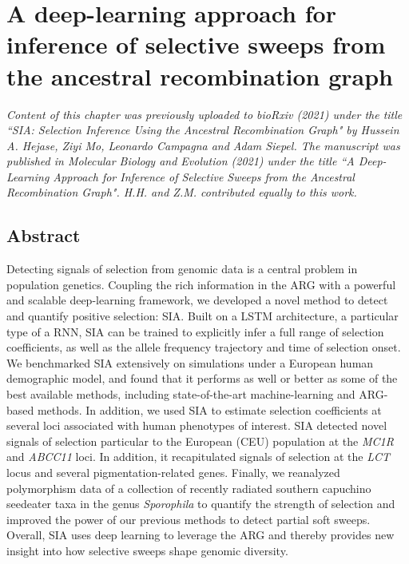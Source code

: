 \chapter{A deep-learning approach for inference of selective sweeps from the ancestral recombination graph}

\textit{Content of this chapter was previously uploaded to bioRxiv (2021) under the title ``SIA: Selection Inference Using the Ancestral Recombination Graph" by Hussein A. Hejase, Ziyi Mo, Leonardo Campagna and Adam Siepel. The manuscript was published in Molecular Biology and Evolution (2021) under the title ``A Deep-Learning Approach for Inference of Selective Sweeps from the Ancestral Recombination Graph". H.H. and Z.M. contributed equally to this work.}

\section{Abstract}

Detecting signals of selection from genomic data is a central problem in population genetics. Coupling the rich information in the \acf{ARG} with a powerful and scalable deep-learning framework, we developed a novel method to detect and quantify positive selection: \acf{SIA}. Built on a \ac{LSTM} architecture, a particular type of a \ac{RNN}, SIA can be trained to explicitly infer a full range of selection coefficients, as well as the allele frequency trajectory and time of selection onset. We benchmarked \ac{SIA} extensively on simulations under a European human demographic model, and found that it performs as well or better as some of the best available methods, including state-of-the-art machine-learning and \ac{ARG}-based methods. In addition, we used \ac{SIA} to estimate selection coefficients at several loci associated with human phenotypes of interest. \ac{SIA} detected novel signals of selection particular to the European (CEU) population at the \textit{MC1R} and \textit{ABCC11} loci. In addition, it recapitulated signals of selection at the \textit{LCT} locus and several pigmentation-related genes. Finally, we reanalyzed polymorphism data of a collection of recently radiated southern capuchino seedeater taxa in the genus \textit{Sporophila} to quantify the strength of selection and improved the power of our previous methods to detect partial soft sweeps. Overall, \ac{SIA} uses deep learning to leverage the \ac{ARG} and thereby provides new insight into how selective sweeps shape genomic diversity.

